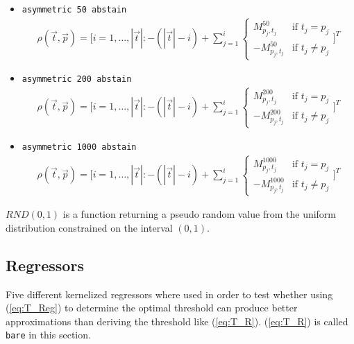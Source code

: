 \documentclass[twoside,11pt]{article}
\begin{document}
\begin{itemize}
  \item \texttt{asymmetric 50 abstain}
    \begin{align*}
      \rho(\vec{t}, \vec{p}) = \Bigg[
      i=1,\dots,|\vec{t}|: -(|\vec{t}| - i)+\sum_{j=1}^{i}
      \begin{cases}
        M^{50}_{p_j,t_j}  &\text{if } t_j = p_j \\
        -M^{50}_{p_j,t_j} &\text{if } t_j \neq p_j
      \end{cases} \Bigg]^T
    \end{align*}

  \item \texttt{asymmetric 200 abstain}
    \begin{align*}
      \rho(\vec{t}, \vec{p}) = \Bigg[
      i=1,\dots,|\vec{t}|: -(|\vec{t}| - i)+\sum_{j=1}^{i}
      \begin{cases}
        M^{200}_{p_j,t_j}  &\text{if } t_j = p_j \\
        -M^{200}_{p_j,t_j} &\text{if } t_j \neq p_j
      \end{cases} \Bigg]^T
    \end{align*}

  \item \texttt{asymmetric 1000 abstain}
    \begin{align*}
      \rho(\vec{t}, \vec{p}) = \Bigg[
      i=1,\dots,|\vec{t}|: -(|\vec{t}| - i)+\sum_{j=1}^{i}
      \begin{cases}
        M^{1000}_{p_j,t_j}  &\text{if } t_j = p_j \\
        -M^{1000}_{p_j,t_j} &\text{if } t_j \neq p_j
      \end{cases} \Bigg]^T
    \end{align*}

\end{itemize}

$RND(0,1)$ is a function returning a pseudo random value
from the uniform distribution constrained on the interval
$(0,1)$.


\subsection{Regressors}
\label{subsec:reg}

Five different kernelized regressors where used in order
to test whether using (\ref{eq:T_Reg}) to determine the
optimal threshold can produce better approximations than
deriving the threshold like (\ref{eq:T_R}).
(\ref{eq:T_R}) is called \texttt{bare} in this section.
\end{document}
